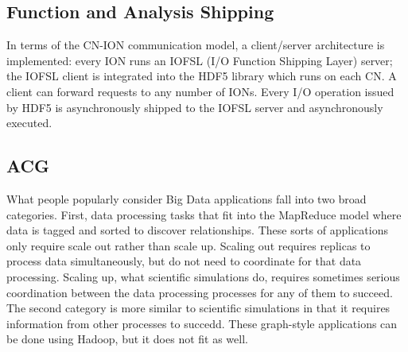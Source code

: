 \documentclass[conference]{IEEEtran}
\newcommand{\DDTns}{D\textsuperscript{2}T}
\begin{document}
%

\subsection{Function and Analysis Shipping}
\label{sec:fn-shipping}

In terms of the CN-ION communication model, a client/server architecture
is implemented: every ION runs an IOFSL (I/O Function Shipping
Layer) server; the IOFSL client is integrated into the HDF5
library which runs on each CN. A client can forward requests to any
number of IONs. Every I/O operation issued by HDF5 is asynchronously
shipped to the IOFSL server and asynchronously executed.

\subsection{ACG}
\label{sec:acg}

What people popularly consider Big Data applications fall into two broad
categories. First, data processing tasks that fit into the MapReduce model
where data is tagged and sorted to discover relationships. These sorts of
applications only require scale out rather than scale up. Scaling out requires
replicas to process data simultaneously, but do not need to coordinate for that
data processing. Scaling up, what scientific simulations do, requires sometimes
serious coordination between the data processing processes for any of them to
succeed. The second category is more similar to scientific simulations in that
it requires information from other processes to succedd. These graph-style
applications can be done using Hadoop, but it does not fit as well.
\end{document}
